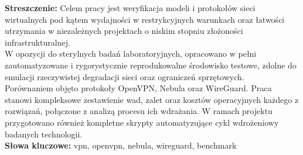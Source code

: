 \newpage
{
    \large
    \textbf{Streszczenie:} Celem pracy jest weryfikacja modeli i protokołów sieci wirtualnych pod kątem wydajności w restrykcyjnych warunkach oraz łatwości utrzymania w niezależnych projektach o niskim stopniu złożoności infrastrukturalnej.\\

    W opozycji do sterylnych badań laboratoryjnych, opracowano w pełni zautomatyzowane i rygorystycznie reprodukowalne środowisko testowe, zdolne do emulacji rzeczywistej degradacji sieci oraz ograniczeń sprzętowych.\\

    Porównaniem objęto protokoły OpenVPN, Nebula oraz WireGuard. Praca stanowi kompleksowe zestawienie wad, zalet oraz kosztów operacyjnych każdego z rozwiązań, połączone z analizą procesu ich wdrażania. W ramach projektu przygotowano również kompletne skrypty automatyzujące cykl wdrożeniowy badanych technologii.\\

    \textbf{Słowa kluczowe:} vpn, openvpn, nebula, wireguard, benchmark
}
